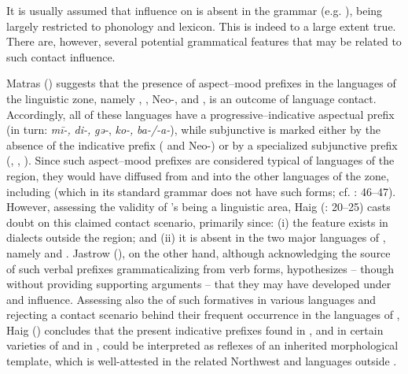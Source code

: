 \documentclass[output=paper]{langsci/langscibook}
\begin{document}
It is usually assumed that  influence on  is absent in the grammar (e.g. \citealt{Edwards1851}), being largely restricted to phonology and lexicon. This is indeed to a large extent true. There are, however, several potential grammatical features that may be related to such contact influence. 

Matras (\citeyear[75]{Matras2010}) suggests that the presence of aspect--mood prefixes in the languages of the   linguistic zone, namely , , Neo-,  and  , is an outcome of language contact. Accordingly, all of these languages have a progressive–indicative aspectual prefix (in turn: \textit{mī-,} \textit{di-,} \textit{gǝ-}, \textit{ko-,} \textit{ba-/-a-}), while subjunctive is marked either by the absence of the indicative prefix ( and Neo-) or by a specialized subjunctive prefix (, , ). Since such aspect--mood prefixes are considered typical of  languages of the region, they would have diffused from  and  into the other languages of the zone, including  (which in its standard grammar does not have such forms; cf. \citealt{Ryding2014}: 46–47). However, assessing the validity of  ’s being a linguistic area, Haig (\citeyear{HaigÖpengin2014}: 20–25) casts doubt on this claimed contact scenario, primarily since: (i) the feature exists in  dialects outside the region; and (ii) it is absent in the two major languages of , namely  and . Jastrow (\citeyear[92]{Jastrow2011Kurdish}), on the other hand, although acknowledging the source of such verbal prefixes grammaticalizing from   verb forms, hypothesizes – though without providing supporting arguments – that they may have developed under  and  influence. Assessing also the  of such formatives in various languages and rejecting a contact scenario behind their frequent occurrence in the languages of , Haig (\citeyear[26]{Haig2014}) concludes that the present indicative prefixes found in , and in certain varieties of  and  in , could be interpreted as reflexes of an inherited morphological template, which is well-attested in the related Northwest  and  languages outside .
\end{document}

